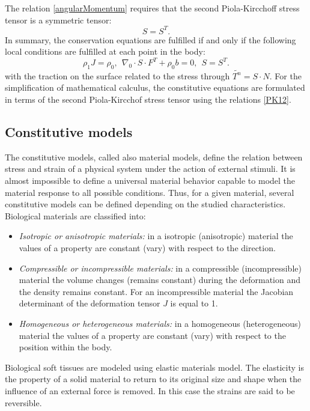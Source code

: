 The relation \ref{angularMomentum} requires that the second Piola-Kircchoff stress tensor is a symmetric tensor:
\begin{equation}
S = S^T.
\end{equation}
In summary, the conservation equations are fulfilled if and only if the following local conditions are fulfilled at each point in the body:
\begin{equation}
\rho_1 J = \rho_0, \ \ \nabla_0 \cdot S \cdot F^T + \rho_0 b =0, \ \ S=S^T.
\end{equation}
with the traction on the surface related to the stress through $\tilde{T^n} = S \cdot N$.
 For the simplification of mathematical calculus, the constitutive equations are formulated in terms of the second Piola-Kircchof stress tensor using the relations \ref{PK12}.

\subsection{Constitutive models}\label{subsection:constitutivemodels}
   The constitutive models, called also material models, define the relation between stress and strain of a physical system under the action of external stimuli. It is almost impossible to define a universal material behavior capable to model the material response to all possible conditions. Thus, for a given material, several constitutive models can be defined depending on the studied characteristics. \\
	Biological materials are classified into:
	\begin{itemize}
\item \textit{ Isotropic or anisotropic materials:} in a isotropic (anisotropic) material the values of a property are constant (vary) with respect to the direction.

\item\textit{ Compressible or incompressible materials:} in a compressible (incompressible) material the volume changes (remains constant) during the deformation and the density remains constant. For an incompressible material the Jacobian determinant of the deformation tensor $J$ is equal to 1. 

\item \textit{Homogeneous or heterogeneous materials:} in a homogeneous (heterogeneous) material the values of a property are constant (vary) with respect to the position within the body.
	\end{itemize}

Biological soft tissues are modeled using elastic materials model. The elasticity is the property of a solid material to return to its original size and shape when the influence of an external force is removed. In this case the strains are said to be reversible. 
	 
